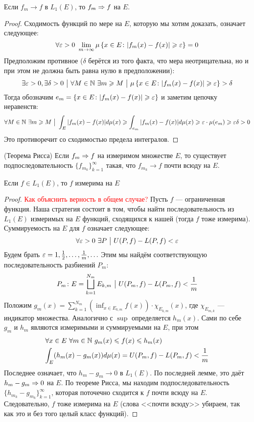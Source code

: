 \begin{lemma}
	Если $f_m \to f$ в $L_1(E)$, то $f_m \Rightarrow f$ на $E$.
\end{lemma}

\begin{proof}
	Сходимость функций по мере на $E$, которую мы хотим доказать, означает следующее:
	\[
		\forall \varepsilon > 0\ \lim_{m \to \infty} \mu\left\{x \in E \colon |f_m(x) - f(x)| \geqslant \varepsilon\right\} = 0
	\]
	Предположим противное ($\delta$ берётся из того факта, что мера неотрицательна, но и при этом не должна быть равна нулю в предположении):
	\[
		\exists \varepsilon > 0, \exists \delta > 0 \ \big|\  \forall M \in \mathbb{N}\ \exists m \geqslant M \ \big|\  \mu\left\{x \in E \colon |f_m(x) - f(x)| \geqslant \varepsilon\right\} > \delta
	\]
	Тогда обозначим $e_m = \{x \in E \colon |f_m(x) - f(x)| \geqslant \varepsilon\}$ и заметим цепочку неравенств:
	\[
		 \forall M \in \mathbb{N}\ \exists m \geqslant M \ \big|\  \int_E |f_m(x) - f(x)|d\mu(x) \geqslant \int_{e_m} |f_m(x) - f(x)|d\mu(x) \geqslant \varepsilon \cdot \mu(e_m) \geqslant \varepsilon \delta > 0
	\]
	Это противоречит со сходимостью предела интегралов.
\end{proof}

\begin{reminder} (Теорема Рисса)
	Если $f_m \Rightarrow f$ на измеримом множестве $E$, то существует подпоследовательность $\{f_{m_k}\}_{k = 1}^\infty$ такая, что $f_{m_k} \to f$ почти всюду на $E$.
\end{reminder}

\begin{proposition}
	Если $f \in L_1(E)$, то $f$ измерима на $E$
\end{proposition}

\begin{proof}
	\textcolor{red}{Как объяснить верность в общем случае?} Пусть $f$ --- ограниченная функция. Наша стратегия состоит в том, чтобы найти последовательность из $L_1(E)$ измеримых на $E$ функций, сходящихся к нашей (тогда $f$ тоже измерима). Суммируемость на $E$ для $f$ означает следующее:
	\[
		\forall \eps > 0\ \exists P \such U(P, f) - L(P, f) < \eps
	\]
	Будем брать $\varepsilon = 1, \frac{1}{2}, \ldots, \frac{1}{m}, \ldots$ Этим мы найдём соответствующую последовательность разбиений $P_m$:
	\[
		P_m \colon E = \bigsqcup_{k = 1}^{N_m} E_{k, m} \ \big|\  U(P_m, f) - L(P_m, f) < \frac{1}{m}
	\]
	Положим $g_m(x) = \sum_{k = 1}^{N_m} (\inf_{x \in E_{k, m}} f(x)) \cdot \chi_{E_{k, m}}(x)$, где $\chi_{E_{m, k}}$ --- индикатор множества. Аналогично с $\sup$ определяется $h_m(x)$. Сами по себе $g_m$ и $h_m$ являются измеримыми и суммируемыми на $E$, при этом
	\begin{align*}
		&{\forall x \in E\ \forall m \in \mathbb{N}\ g_m(x) \leqslant f(x) \leqslant h_m(x)}
		\\
		&{\int_E (h_m(x) - g_m(x))d\mu(x) = U(P_m, f) - L(P_m, f) < \frac{1}{m}}
	\end{align*}
	Последнее означает, что $h_m - g_m \to 0$ в $L_1(E)$. По последней лемме, это даёт $h_m - g_m \Rightarrow 0$ на $E$. По теореме Рисса, мы находим подпоследовательность $\{h_{m_k} - g_{m_k}\}_{k = 1}^\infty$, которая поточечно сходится к $f$ почти всюду на $E$. Следовательно, $f$ тоже измерима на $E$ (слова <<почти всюду>> убираем, так как это и без того целый класс функций).
\end{proof}

